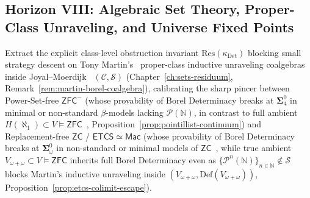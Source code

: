 \subsection*{Horizon VIII: Algebraic Set Theory, Proper-Class Unraveling, and Universe Fixed Points}

\begin{problem}\label{prob:open-15}
Extract the explicit class-level obstruction invariant $\mathrm{Res}(\kappa_{\mathrm{Det}})$ blocking small strategy descent on Tony Martin's~\cite{Martin75} proper-class inductive unraveling coalgebras inside Joyal--Moerdijk~\cite{JoyalMoerdijk95} $(\mathcal{C}, \mathcal{S})$ (Chapter~\ref{ch:sets-residuum}, Remark~\ref{rem:martin-borel-coalgebra}), calibrating the sharp pincer between Power-Set-free $\mathsf{ZFC}^-$ (whose provability of Borel Determinacy breaks at $\boldsymbol{\Sigma}^0_4$ in minimal or non-standard $\beta$-models lacking $\mathcal{P}(\mathbb{N})$, in contrast to full ambient $H(\aleph_1) \subset V \models \mathsf{ZFC}$~\cite{Friedman71,MontalbanShore12,GitmanHamkinsJohnstone16}, Proposition~\ref{prop:pointillist-continuum}) and Replacement-free $\mathsf{ZC}$ / $\mathsf{ETCS} \simeq \mathsf{Mac}$ (whose provability of Borel Determinacy breaks at $\boldsymbol{\Sigma}^0_\omega$ in non-standard or minimal models of $\mathsf{ZC}$~\cite{Friedman71}, while true ambient $V_{\omega+\omega} \subset V \models \mathsf{ZFC}$ inherits full Borel Determinacy even as $\{\mathcal{P}^n(\mathbb{N})\}_{n \in \mathbb{N}} \notin \mathcal{S}$ blocks Martin's inductive unraveling inside $(V_{\omega+\omega}, \mathrm{Def}(V_{\omega+\omega}))$, Proposition~\ref{prop:etcs-colimit-escape}).
\end{problem}

